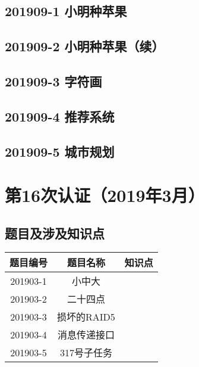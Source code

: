 \documentclass[cn,10pt,math=newtx,citestyle=gb7714-2015,bibstyle=gb7714-2015]{elegantbook}
\newif\ifonlyanalyze %
\begin{document}
\newpage
\section{201909-1 小明种苹果}
\ifonlyanalyze
\else
    
\fi


\newpage
\section{201909-2 小明种苹果（续）}
\ifonlyanalyze
\else
    
\fi


\newpage
\section{201909-3 字符画}
\ifonlyanalyze
\else
    
\fi


\newpage
\section{201909-4 推荐系统}
\ifonlyanalyze
\else
    
\fi


\newpage
\section{201909-5 城市规划}
\ifonlyanalyze
\else
    
\fi



\chapter{第16次认证（2019年3月）}

\section{题目及涉及知识点}

\begin{table}[htbp]
    \centering
    \begin{tabular}{ccc}
        \toprule
        题目编号 & 题目名称     & 知识点 \\
        \midrule
        201903-1 & 小中大       &        \\
        201903-2 & 二十四点     &        \\
        201903-3 & 损坏的RAID5  &        \\
        201903-4 & 消息传递接口 &        \\
        201903-5 & 317号子任务  &        \\
        \bottomrule
    \end{tabular}
\end{table}
\end{document}
